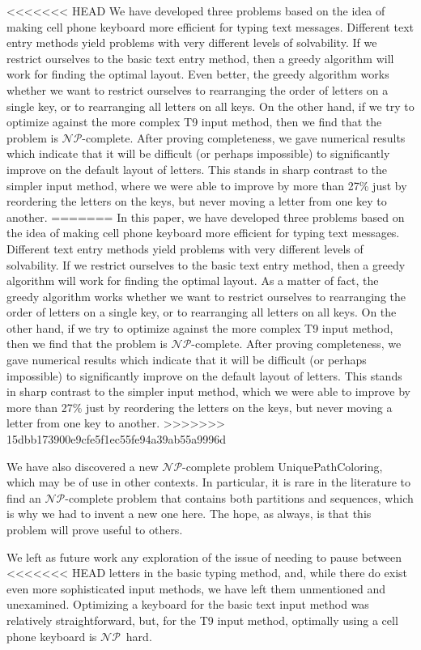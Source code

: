 \documentclass[runningheads]{llncs}
\newcommand{\NP}{\ensuremath{\mathcal{NP}}}
\begin{document}
\begin{prob}[{\sc
MinimumKeystrokes}]
<<<<<<< HEAD
We have developed three problems based on the idea of making cell phone keyboard more efficient for typing text messages.  Different text entry methods yield problems with very different levels of solvability.  If we restrict ourselves to the basic text entry method, then a greedy algorithm will work for finding the optimal layout.  Even better, the greedy algorithm works whether we want to restrict ourselves to rearranging the order of letters on a single key, or to rearranging all letters on all keys.  On the other hand, if we try to optimize against the more complex T9 input method, then we find that the problem is \NP-complete.  After proving completeness, we gave numerical results which indicate that it will be difficult (or perhaps impossible) to significantly improve on the default layout of letters.  This stands in sharp contrast to the simpler input method, where we were able to improve by more than 27\% just by reordering the letters on the keys, but never moving a letter from one key to another.
=======
In this paper, we have developed three problems based on the idea of making cell phone keyboard more efficient for typing text messages.  Different text entry methods yield problems with very different levels of solvability.  If we restrict ourselves to the basic text entry method, then a greedy algorithm will work for finding the optimal layout.  As a matter of fact, the greedy algorithm works whether we want to restrict ourselves to rearranging the order of letters on a single key, or to rearranging all letters on all keys.  On the other hand, if we try to optimize against the more complex T9 input method, then we find that the problem is \NP-complete.  After proving completeness, we gave numerical results which indicate that it will be difficult (or perhaps impossible) to significantly improve on the default layout of letters.  This stands in sharp contrast to the simpler input method, which we were able to improve by more than 27\% just by reordering the letters on the keys, but never moving a letter from one key to another.
>>>>>>> 15dbb173900e9cfe5f1ec55fe94a39ab55a9996d

We have also discovered a new \NP-complete problem {\sc UniquePathColoring}, which may be of use in other contexts.  In particular, it is rare in the literature to find an \NP-complete problem that contains both partitions and sequences, which is why we had to invent a new one here.  The hope, as always, is that this problem will prove useful to others.

We left as future work any exploration of the issue of needing to pause between
<<<<<<< HEAD
letters in the basic typing method, and, while there do exist even more
sophisticated input methods\cite{hcimethods}, we have left them unmentioned and unexamined.  Optimizing a keyboard for the basic text input method was relatively straightforward, but, for the T9 input method, optimally using a cell phone keyboard is \NP\ hard.


\end{prob}
\end{document}
